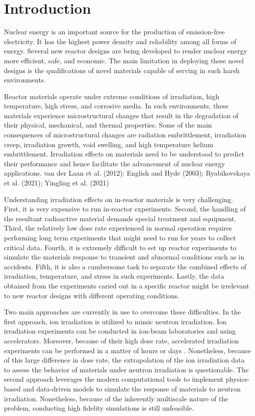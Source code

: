 \documentclass[utf8]{frontiersSCNS} %
\begin{document}
\section{Introduction}

Nuclear energy is an important source for the production of emission-free electricity. It has the highest power density and reliability among all forms of energy. Several new reactor designs are being developed to render nuclear energy more efficient, safe, and economic. The main limitation in deploying these novel designs is the qualifications of novel materials capable of serving in such harsh environments.

Reactor materials operate under extreme conditions of irradiation, high temperature, high stress, and corrosive media. In such environments, these materials experience microstructural changes that result in the degradation of their physical, mechanical, and thermal properties. Some of the main consequences of microstructural changes are radiation embrittlement, irradiation creep, irradiation growth, void swelling, and high temperature helium embrittlement. Irradiation effects on materials need to be understood to predict their performance and hence facilitate the advancement of nuclear energy applications. van der Laan et al. (2012); English and Hyde (2003); Ryabikovskaya et al. (2021); Yingling et al. (2021)

Understanding irradiation effects on in-reactor materials is very challenging. First, it is very expensive to run in-reactor experiments. Second, the handling of the resultant radioactive material demands special treatment and equipment. Third, the relatively low dose rate experienced in normal operation requires performing long term experiments that might need to run for years to collect critical data. Fourth, it is extremely difficult to set up reactor experiments to simulate the materials response to transient and abnormal conditions such as in accidents. Fifth, it is also a cumbersome task to separate the combined effects of irradiation, temperature, and stress in such experiments. Lastly, the data obtained from the experiments caried out in a specific reactor might be irrelevant to new reactor designs with different operating conditions.

Two main approaches are currently in use to overcome these difficulties. In the first approach, ion irradiation is utilized to mimic neutron irradiation. Ion irradiation experiments can be conducted in ion-beam laboratories and using accelerators. Moreover, because of their high dose rate, accelerated irradiation experiments can be performed in a matter of hours or days \cite{shao2017, sun2017, krasheninnikov2010, was2014, zhang2018}. Nonetheless, because of this large difference in dose rate, the extrapolation of the ion irradiation data to assess the behavior of materials under neutron irradiation is questionable. The second approach leverages the modern computational tools to implement physics-based and data-driven models to simulate the response of materials to neutron irradiation. Nonetheless, because of the inherently multiscale nature of the problem, conducting high fidelity simulations is still unfeasible. 
\end{document}
